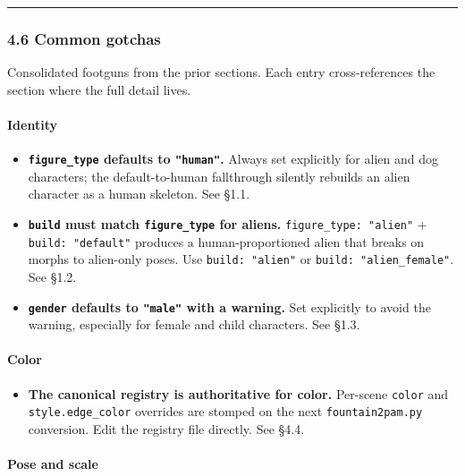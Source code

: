 \documentclass[
  11pt,
]{book}
\providecommand{\tightlist}{%
  \setlength{\itemsep}{0pt}\setlength{\parskip}{0pt}}
\begin{document}
\begin{center}\rule{0.5\linewidth}{0.5pt}\end{center}

\subsubsection{4.6 Common gotchas}\label{common-gotchas}

Consolidated footguns from the prior sections. Each entry
cross-references the section where the full detail lives.

\paragraph{Identity}\label{identity}

\begin{itemize}
\tightlist
\item
  \textbf{\texttt{figure\_type} defaults to \texttt{"human"}.} Always
  set explicitly for alien and dog characters; the default-to-human
  fallthrough silently rebuilds an alien character as a human skeleton.
  See §1.1.
\item
  \textbf{\texttt{build} must match \texttt{figure\_type} for aliens.}
  \texttt{figure\_type:\ "alien"} + \texttt{build:\ "default"} produces
  a human-proportioned alien that breaks on morphs to alien-only poses.
  Use \texttt{build:\ "alien"} or \texttt{build:\ "alien\_female"}. See
  §1.2.
\item
  \textbf{\texttt{gender} defaults to \texttt{"male"} with a warning.}
  Set explicitly to avoid the warning, especially for female and child
  characters. See §1.3.
\end{itemize}

\paragraph{Color}\label{color-1}

\begin{itemize}
\tightlist
\item
  \textbf{The canonical registry is authoritative for color.} Per-scene
  \texttt{color} and \texttt{style.edge\_color} overrides are stomped on
  the next \texttt{fountain2pam.py} conversion. Edit the registry file
  directly. See §4.4.
\end{itemize}

\paragraph{Pose and scale}\label{pose-and-scale}
\end{document}
